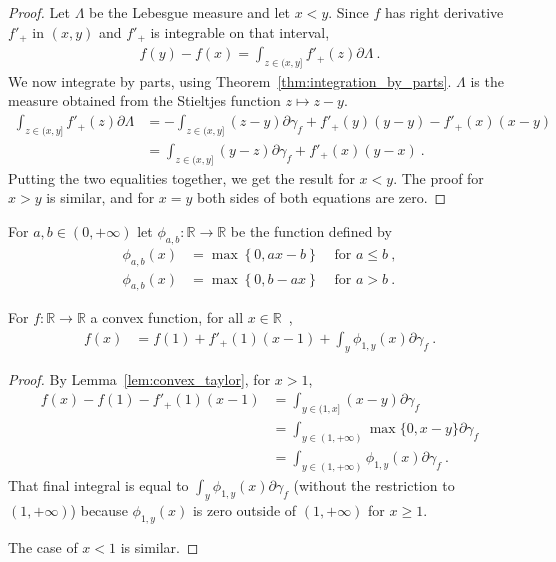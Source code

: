 \begin{proof}\leanok
{}
Let $\Lambda$ be the Lebesgue measure and let $x < y$. Since $f$ has right derivative $f'_+$ in $(x,y)$ and $f'_+$ is integrable on that interval,
\begin{align*}
f(y) - f(x) = \int_{z \in (x, y]} f'_+(z) \partial \Lambda
\: .
\end{align*}
We now integrate by parts, using Theorem~\ref{thm:integration_by_parts}. $\Lambda$ is the measure obtained from the Stieltjes function $z \mapsto z - y$.
\begin{align*}
\int_{z \in (x, y]} f'_+(z) \partial \Lambda
&= - \int_{z \in (x,y]} (z - y)\partial \gamma_f + f'_+(y)(y - y) - f'_+(x)(x - y)
\\
&= \int_{z \in (x,y]} (y - z)\partial \gamma_f + f'_+(x)(y - x)
\: .
\end{align*}
Putting the two equalities together, we get the result for $x < y$. The proof for $x > y$ is similar, and for $x = y$ both sides of both equations are zero.
\end{proof}


\begin{definition}
  \label{def:statInfoFun}
  \leanok
  \uses{}
  For $a,b \in (0, +\infty)$ let $\phi_{a,b} : \mathbb{R} \to \mathbb{R}$ be the function defined by
  \begin{align*}
  \phi_{a,b}(x) &= \max\left\{0, a x - b \right\} & \text{ for } a \le b \: ,
  \\
  \phi_{a,b}(x) &= \max\left\{0, b - a x \right\} & \text{ for } a > b \: .
  \end{align*}
\end{definition}


\begin{corollary}
  \label{cor:convex_taylor_statInfoFun}
  For $f: \mathbb{R} \to \mathbb{R}$ a convex function, for all $x \in \mathbb{R}$~,
  \begin{align*}
  f(x) &= f(1) + f'_+(1) (x - 1) + \int_{y} \phi_{1,y}(x) \partial\gamma_f \: .
  \end{align*}
\end{corollary}

\begin{proof}%
{}
By Lemma~\ref{lem:convex_taylor}, for $x > 1$,
\begin{align*}
f(x) - f(1) - f'_+(1) (x - 1)
&= \int_{y \in (1, x]} (x - y) \partial\gamma_f
\\
&= \int_{y \in (1, +\infty)} \max\{0, x - y\} \partial\gamma_f
\\
&= \int_{y \in (1, +\infty)} \phi_{1,y}(x) \partial\gamma_f
\: .
\end{align*}
That final integral is equal to $\int_y \phi_{1,y}(x) \partial\gamma_f$ (without the restriction to $(1, +\infty)$) because $\phi_{1,y}(x)$ is zero outside of $(1, +\infty)$ for $x \ge 1$.

The case of $x < 1$ is similar.
\end{proof}


